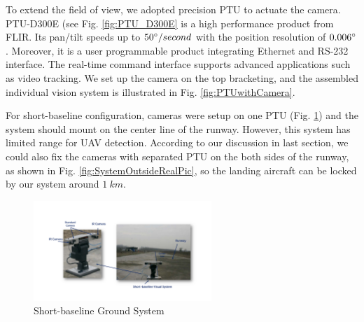 To extend the field of view, we adopted precision PTU to actuate the camera. PTU-D300E (see Fig. \ref{fig:PTU_D300E} is a high performance product from FLIR. Its pan/tilt speeds up to $50\degree/second$ with the position resolution of $0.006\degree$. Moreover, it is a user programmable product integrating Ethernet  and RS-232 interface. The real-time command interface supports advanced applications such as video tracking. We set up the camera on the top bracketing, and the assembled individual vision system is illustrated in Fig. \ref{fig:PTUwithCamera}. 



For short-baseline configuration, cameras were setup on one PTU (Fig. \ref{fig:chp08_18_ground_short_ptus}) and the system should mount on the center line of the runway. However, this system has limited range for UAV detection. According to our discussion in last section, we could also fix the cameras with separated PTU on the both sides of the runway, as shown in Fig. \ref{fig:SystemOutsideRealPic}, so the landing aircraft can be locked by our system around $1\ km$.

\begin{figure}[!ht]
	\centering
	\includegraphics[width=0.6\textwidth]{Figs/chp08_18_ground_short_ptus.pdf}	
	\caption{Short-baseline Ground System}
	\label{fig:chp08_18_ground_short_ptus}
\end{figure}



